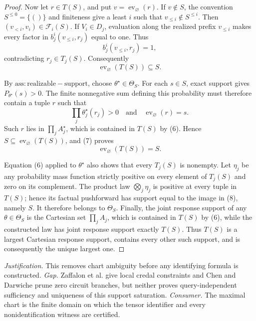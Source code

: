 \documentclass{article}
\begin{document}
\begin{proof}
Now let \(r\in T(S)\), and put \(v=\operatorname{ev}_{\varnothing}(r)\).  If \(v\notin S\), the convention \(S^{\le0}=\{()\}\) and finiteness give a least \(i\) such that \(v_{\le i}\notin S^{\le i}\).  Then \((v_{<i},v_i)\in\mathcal F_i(S)\).  If \(V_i\in D_j\), evaluation along the realized prefix \(v_{\le i}\) makes every factor in \(b_j^i(v_{\le i},r_j)\) equal to one.  Thus
\[
b_j^i(v_{\le i},r_j)=1,
\]
contradicting \(r_j\in T_j(S)\).  Consequently
\[
\operatorname{ev}_{\varnothing}(T(S))\subseteq S.            \tag{7}
\]

By \(\mathrm{ass:realizable-support}\), choose \(\theta^\star\in\Theta_S\).  For each \(s\in S\), exact support gives \(P_{\theta^\star}(s)>0\).  The finite nonnegative sum defining this probability must therefore contain a tuple \(r\) such that
\[
\prod_j\theta_j^\star(r_j)>0
\quad\text{and}\quad
\operatorname{ev}_{\varnothing}(r)=s.
\]
Such \(r\) lies in \(\prod_j A_j^\star\), which is contained in \(T(S)\) by (6).  Hence \(S\subseteq\operatorname{ev}_{\varnothing}(T(S))\), and (7) proves
\[
\operatorname{ev}_{\varnothing}(T(S))=S.                     \tag{8}
\]

Equation (6) applied to \(\theta^\star\) also shows that every \(T_j(S)\) is nonempty.  Let \(\eta_j\) be any probability mass function strictly positive on every element of \(T_j(S)\) and zero on its complement.  The product law \(\bigotimes_j\eta_j\) is positive at every tuple in \(T(S)\); hence its factual pushforward has support equal to the image in (8), namely \(S\).  It therefore belongs to \(\Theta_S\).  Finally, the joint response support of any \(\theta\in\Theta_S\) is the Cartesian set \(\prod_j A_j\), which is contained in \(T(S)\) by (6), while the constructed law has joint response support exactly \(T(S)\).  Thus \(T(S)\) is a largest Cartesian response support, contains every other such support, and is consequently the unique largest one.
\end{proof}
\par\smallskip\noindent \textit{Justification.} This removes chart ambiguity before any identifying formula is constructed. \textit{Gap.} Zaffalon et al. give local credal constraints and Chen and Darwiche prune zero circuit branches, but neither proves query-independent sufficiency and uniqueness of this support saturation. \textit{Consumer.} The maximal chart is the finite domain on which the tensor identifier and every nonidentification witness are certified.
\end{document}
